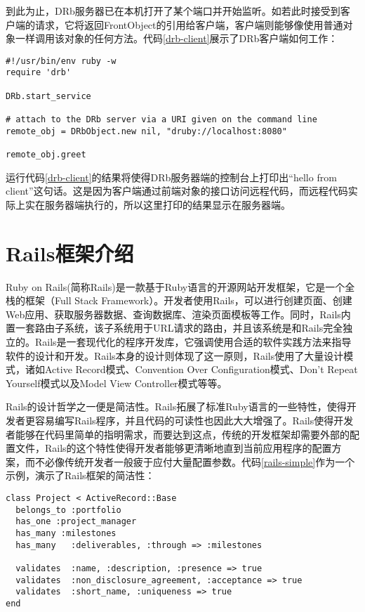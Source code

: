 到此为止，DRb服务器已在本机打开了某个端口并开始监听。如若此时接受到客户端的请求，它将返回FrontObject的引用给客户端，客户端则能够像使用普通对象一样调用该对象的任何方法。代码\ref{drb-client}展示了DRb客户端如何工作：

\begin{lstlisting}[caption={DRb客户端实现代码}, label=drb-client]
#!/usr/bin/env ruby -w
require 'drb'

DRb.start_service

# attach to the DRb server via a URI given on the command line
remote_obj = DRbObject.new nil, "druby://localhost:8080"

remote_obj.greet
\end{lstlisting}

运行代码\ref{drb-client}的结果将使得DRb服务器端的控制台上打印出“hello from client”这句话。这是因为客户端通过前端对象的接口访问远程代码，而远程代码实际上实在服务器端执行的，所以这里打印的结果显示在服务器端。

\section{Rails框架介绍}
Ruby on Rails(简称Rails)是一款基于Ruby语言的开源网站开发框架，它是一个全栈的框架（Full Stack Framework）\supercite{rails-book}。开发者使用Rails，可以进行创建页面、创建Web应用、获取服务器数据、查询数据库、渲染页面模板等工作。同时，Rails内置一套路由子系统，该子系统用于URL请求的路由，并且该系统是和Rails完全独立的。Rails是一套现代化的程序开发库，它强调使用合适的软件实践方法来指导软件的设计和开发。Rails本身的设计则体现了这一原则，Rails使用了大量设计模式，诸如Active Record模式、Convention Over Configuration模式、Don't Repeat Yourself模式以及Model View Controller模式等等。

Rails的设计哲学之一便是简洁性。Rails拓展了标准Ruby语言的一些特性，使得开发者更容易编写Rails程序，并且代码的可读性也因此大大增强了。Rails使得开发者能够在代码里简单的指明需求，而要达到这点，传统的开发框架却需要外部的配置文件，Rails的这个特性使得开发者能够更清晰地直到当前应用程序的配置方案，而不必像传统开发者一般疲于应付大量配置参数。代码\ref{rails-simple}作为一个示例，演示了Rails框架的简洁性：

\begin{lstlisting}[caption={简单的Rails程序示例}, label=rails-simple]
class Project < ActiveRecord::Base 
  belongs_to :portfolio
  has_one :project_manager 
  has_many :milestones
  has_many   :deliverables, :through => :milestones
  
  validates  :name, :description, :presence => true
  validates  :non_disclosure_agreement, :acceptance => true
  validates  :short_name, :uniqueness => true
end
\end{lstlisting}


